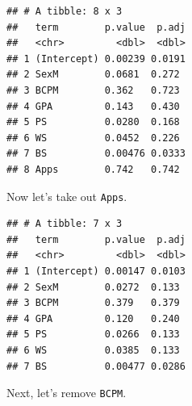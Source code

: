 \documentclass[
]{book}
\newenvironment{Shaded}{\begin{snugshade}}{\end{snugshade}}
\newcommand{\DataTypeTok}[1]{\textcolor[rgb]{0.13,0.29,0.53}{#1}}
\newcommand{\KeywordTok}[1]{\textcolor[rgb]{0.13,0.29,0.53}{\textbf{#1}}}
\newcommand{\NormalTok}[1]{#1}
\newcommand{\OperatorTok}[1]{\textcolor[rgb]{0.81,0.36,0.00}{\textbf{#1}}}
\newcommand{\StringTok}[1]{\textcolor[rgb]{0.31,0.60,0.02}{#1}}
\begin{document}
\begin{verbatim}
## # A tibble: 8 x 3
##   term        p.value  p.adj
##   <chr>         <dbl>  <dbl>
## 1 (Intercept) 0.00239 0.0191
## 2 SexM        0.0681  0.272 
## 3 BCPM        0.362   0.723 
## 4 GPA         0.143   0.430 
## 5 PS          0.0280  0.168 
## 6 WS          0.0452  0.226 
## 7 BS          0.00476 0.0333
## 8 Apps        0.742   0.742
\end{verbatim}

Now let's take out \texttt{Apps}.

\begin{Shaded}
\end{Shaded}

\begin{verbatim}
## # A tibble: 7 x 3
##   term        p.value  p.adj
##   <chr>         <dbl>  <dbl>
## 1 (Intercept) 0.00147 0.0103
## 2 SexM        0.0272  0.133 
## 3 BCPM        0.379   0.379 
## 4 GPA         0.120   0.240 
## 5 PS          0.0266  0.133 
## 6 WS          0.0385  0.133 
## 7 BS          0.00477 0.0286
\end{verbatim}

Next, let's remove \texttt{BCPM}.

\begin{Shaded}
\end{Shaded}
\end{document}
